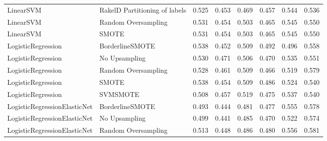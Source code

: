 \begin{tabular}{llllllll}
                      LinearSVM & RakelD Partitioning of labels & 0.525 &                     0.453 &                 0.469 &                  0.457 &                                   0.544 &     0.536 \\
                      LinearSVM &           Random Oversampling & 0.531 &                     0.454 &                 0.503 &                  0.465 &                                   0.545 &     0.550 \\
                      LinearSVM &                         SMOTE & 0.531 &                     0.454 &                 0.503 &                  0.465 &                                   0.545 &     0.550 \\
             LogisticRegression &               BorderlineSMOTE & 0.538 &                     0.452 &                 0.509 &                  0.492 &                                   0.496 &     0.558 \\
             LogisticRegression &                 No Upsampling & 0.530 &                     0.471 &                 0.506 &                  0.470 &                                   0.535 &     0.551 \\
             LogisticRegression &           Random Oversampling & 0.528 &                     0.461 &                 0.509 &                  0.466 &                                   0.519 &     0.579 \\
             LogisticRegression &                         SMOTE & 0.538 &                     0.454 &                 0.509 &                  0.486 &                                   0.524 &     0.540 \\
             LogisticRegression &                      SVMSMOTE & 0.508 &                     0.457 &                 0.519 &                  0.475 &                                   0.537 &     0.540 \\
   LogisticRegressionElasticNet &               BorderlineSMOTE & 0.493 &                     0.444 &                 0.481 &                  0.477 &                                   0.555 &     0.578 \\
   LogisticRegressionElasticNet &                 No Upsampling & 0.499 &                     0.441 &                 0.485 &                  0.470 &                                   0.522 &     0.574 \\
   LogisticRegressionElasticNet &           Random Oversampling & 0.513 &                     0.448 &                 0.486 &                  0.480 &                                   0.556 &     0.581 \\

\end{tabular}

